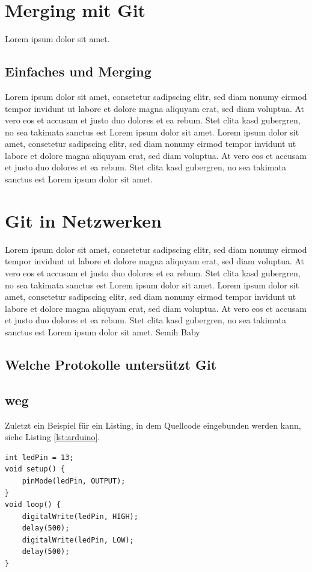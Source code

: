 \documentclass[12pt,a4paper,bibliography=totocnumbered,listof=totocnumbered]{scrartcl}
\begin{document}
\section{Merging mit Git}
Lorem ipsum dolor sit amet.

\subsection{Einfaches und Merging}
Lorem ipsum dolor sit amet, consetetur sadipscing elitr, sed diam nonumy eirmod tempor invidunt ut labore et dolore magna aliquyam erat, sed diam voluptua. At vero eos et accusam et justo duo dolores et ea rebum. Stet clita kasd gubergren, no sea takimata sanctus est Lorem ipsum dolor sit amet. Lorem ipsum dolor sit amet, consetetur sadipscing elitr, sed diam nonumy eirmod tempor invidunt ut labore et dolore magna aliquyam erat, sed diam voluptua. At vero eos et accusam et justo duo dolores et ea rebum. Stet clita kasd gubergren, no sea takimata sanctus est Lorem ipsum dolor sit amet.
\pagebreak
\section{Git in Netzwerken}
Lorem ipsum dolor sit amet, consetetur sadipscing elitr, sed diam nonumy eirmod tempor invidunt ut labore et dolore magna aliquyam erat, sed diam voluptua. At vero eos et accusam et justo duo dolores et ea rebum. Stet clita kasd gubergren, no sea takimata sanctus est Lorem ipsum dolor sit amet. Lorem ipsum dolor sit amet, consetetur sadipscing elitr, sed diam nonumy eirmod tempor invidunt ut labore et dolore magna aliquyam erat, sed diam voluptua. At vero eos et accusam et justo duo dolores et ea rebum. Stet clita kasd gubergren, no sea takimata sanctus est Lorem ipsum dolor sit amet. Semih Baby

\subsection{Welche Protokolle untersützt Git}
\pagebreak

\subsection{weg}
Zuletzt ein Beispiel für ein Listing, in dem Quellcode eingebunden werden kann, siehe Listing \ref{lst:arduino}.

\vspace{1em}
\begin{lstlisting}[caption=Arduino Beispielprogramm, label=lst:arduino]
int ledPin = 13;
void setup() {
    pinMode(ledPin, OUTPUT);
}
void loop() {
    digitalWrite(ledPin, HIGH);
    delay(500);
    digitalWrite(ledPin, LOW);
    delay(500);
}
\end{lstlisting}
\end{document}
